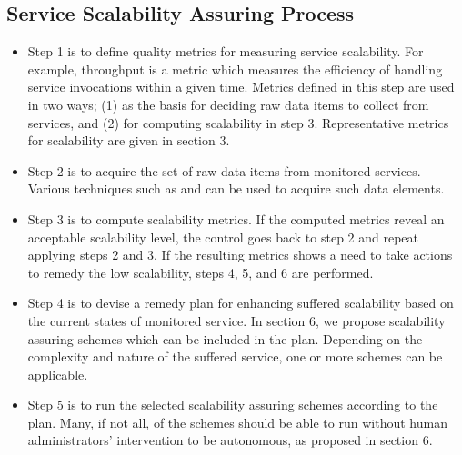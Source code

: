 \subsection{Service Scalability Assuring Process}


\begin{itemize}
	

\item Step 1 is to define quality metrics for measuring service scalability. For example, throughput is a metric which measures the efficiency of handling service invocations within a given time. Metrics defined in this step are used in two ways; (1) as the basis for deciding raw data items to collect from services, and (2) for computing scalability in step 3. Representative metrics for scalability are given in section 3. 

\item Step 2 is to acquire the set of raw data items from monitored services. Various techniques such as \cite{Artaiam2008EnhancingSQ} and \cite{hutchison_monitoring_2007} can be used to acquire such data elements. 



\item Step 3 is to compute scalability metrics. If the computed metrics reveal an acceptable scalability level, the control goes back to step 2 and repeat applying steps 2 and 3. If the resulting metrics shows a need to take actions to remedy the low scalability, steps 4, 5, and 6 are performed. 


\item Step 4 is to devise a remedy plan for enhancing suffered scalability based on the current states of monitored service. In section 6, we propose scalability assuring schemes which can be included in the plan. Depending on the complexity and nature of the suffered service, one or more schemes can be applicable. 


\item Step 5 is to run the selected scalability assuring schemes according to the plan. Many, if not all, of the schemes should be able to run without human administrators’ intervention to be autonomous, as proposed in section 6. 


\end{itemize}
